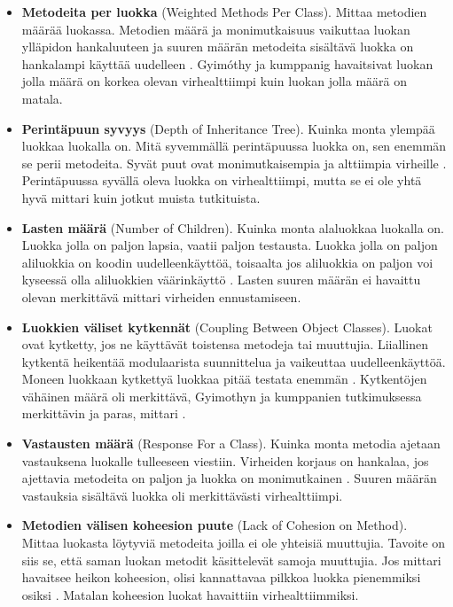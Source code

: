 \documentclass[finnish]{tktltiki2}
\theoremstyle{definition}
\theoremstyle{remark}
\begin{document}
\begin{itemize}

  \item \textbf{Metodeita per luokka} (Weighted Methods Per Class). Mittaa metodien määrää luokassa. Metodien määrä ja monimutkaisuus vaikuttaa luokan ylläpidon hankaluuteen ja suuren määrän metodeita sisältävä luokka on hankalampi käyttää uudelleen \cite{Chidamber94}. Gyimóthy ja kumppanig havaitsivat luokan jolla määrä on korkea olevan virhealttiimpi kuin luokan jolla määrä on matala. \cite{Gyimothy05}

  \item \textbf{Perintäpuun syvyys} (Depth of Inheritance Tree). Kuinka monta ylempää luokkaa luokalla on. Mitä syvemmällä perintäpuussa luokka on, sen enemmän se perii metodeita. Syvät puut ovat monimutkaisempia ja alttiimpia virheille \cite{Chidamber94}. Perintäpuussa syvällä oleva luokka on virhealttiimpi, mutta se ei ole yhtä hyvä mittari kuin jotkut muista tutkituista. \cite{Gyimothy05}

  \item \textbf{Lasten määrä} (Number of Children). Kuinka monta alaluokkaa luokalla on. Luokka jolla on paljon lapsia, vaatii paljon testausta. Luokka jolla on paljon aliluokkia on koodin uudelleenkäyttöä, toisaalta jos aliluokkia on paljon voi kyseessä olla aliluokkien väärinkäyttö \cite{Chidamber94}. Lasten suuren määrän ei havaittu olevan merkittävä mittari virheiden ennustamiseen. \cite{Gyimothy05}

  \item \textbf{Luokkien väliset kytkennät} (Coupling Between Object Classes). Luokat ovat kytketty, jos ne käyttävät toistensa metodeja tai muuttujia. Liiallinen kytkentä heikentää modulaarista suunnittelua ja vaikeuttaa uudelleenkäyttöä. Moneen luokkaan kytkettyä luokkaa pitää testata enemmän \cite{Chidamber94}. Kytkentöjen vähäinen määrä oli merkittävä, Gyimothyn ja kumppanien tutkimuksessa merkittävin ja paras, mittari \cite{Gyimothy05}.

  \item \textbf{Vastausten määrä} (Response For a Class). Kuinka monta metodia ajetaan vastauksena luokalle tulleeseen viestiin. Virheiden korjaus on hankalaa, jos ajettavia metodeita on paljon ja luokka on monimutkainen \cite{Chidamber94}. Suuren määrän vastauksia sisältävä luokka oli merkittävästi virhealttiimpi. \cite{Gyimothy05}

  \item \textbf{Metodien välisen koheesion puute} (Lack of Cohesion on Method). Mittaa luokasta löytyviä metodeita joilla ei ole yhteisiä muuttujia. Tavoite on siis se, että saman luokan metodit käsittelevät samoja muuttujia. Jos mittari havaitsee heikon koheesion, olisi kannattavaa pilkkoa luokka pienemmiksi osiksi \cite{Chidamber94}. Matalan koheesion luokat havaittiin virhealttiimmiksi. \cite{Gyimothy05}


\end{itemize}
\end{document}
